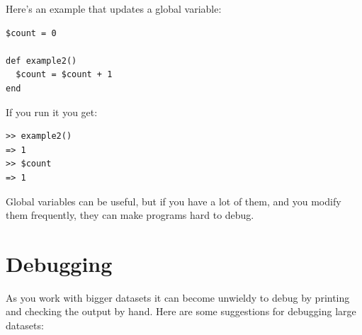 \documentclass[10pt]{book}
\begin{document}
Here's an example that updates a global variable:

\begin{verbatim}
$count = 0

def example2()
  $count = $count + 1
end
\end{verbatim}
%
If you run it you get:

\begin{verbatim}
>> example2()
=> 1
>> $count
=> 1
\end{verbatim}
%
%
Global variables can be useful, but if you have a lot of them,
and you modify them frequently, they can make programs
hard to debug.


\section{Debugging}

As you work with bigger datasets it can become unwieldy to
debug by printing and checking the output by hand.  Here are some
suggestions for debugging large datasets:
\end{document}
